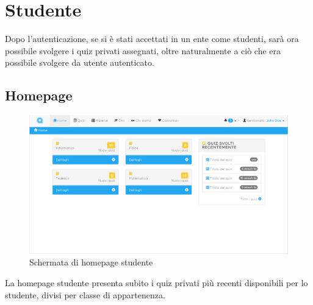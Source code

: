 \documentclass[a4paper, titlepage]{article}
\begin{document}
	 \newpage
	 \section{Studente}
	 Dopo l'autenticazione, se si è stati accettati in un ente come studenti, sarà ora possibile svolgere i quiz privati assegnati, oltre naturalmente a ciò che era possibile svolgere da utente autenticato.
	 
	 \subsection{Homepage}
	 \begin{figure}[!h]
	 	\centering
	 	\includegraphics[scale=0.33]{Img/screen_HomepageStudente.png}
	 	\caption{Schermata di homepage studente}
	 \end{figure}
	 La homepage studente presenta subito i quiz privati più recenti disponibili per lo studente, divisi per classe di appartenenza.
	 
	 \newpage
\end{document}
